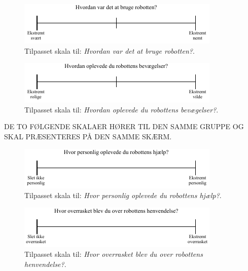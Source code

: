 \noindent
%
%
\begin{figure}[H]
\centering
\includegraphics[width =\textwidth]{Figure/TilpasningAfSkalaer/TilpassetHvordanVarDetAtBrugeR} 
\caption{Tilpasset skala til: \textit{Hvordan var det at bruge robotten?}.}
\label{fig:TilpasningBrugAfR}
\end{figure}
\noindent
%
%
\begin{figure}[H]
\centering
\includegraphics[width =\textwidth]{Figure/TilpasningAfSkalaer/TilpassetBevaegelserR} 
\caption{Tilpasset skala til: \textit{Hvordan oplevede du robottens bevægelser?}.}
\label{fig:TilpasningBevaegelserR}
\end{figure}
\noindent
%
DE TO FØLGENDE SKALAER HØRER TIL DEN SAMME GRUPPE OG SKAL PRÆSENTERES PÅ DEN SAMME SKÆRM.
%
\begin{figure}[H]
\centering
\includegraphics[width =\textwidth]{Figure/TilpasningAfSkalaer/TilpassetPersonligHjaelp} 
\caption{Tilpasset skala til: \textit{Hvor personlig oplevede du robottens hjælp?}.}
\label{fig:TilpasningPersonligHjaelp}
\end{figure}
\noindent
%
%
\begin{figure}[H]
\centering
\includegraphics[width =\textwidth]{Figure/TilpasningAfSkalaer/TilpassetOverrasketOverR} 
\caption{Tilpasset skala til: \textit{Hvor overrasket blev du over robottens henvendelse?}.}
\label{fig:TilpasningOverrasketOverR}
\end{figure}
